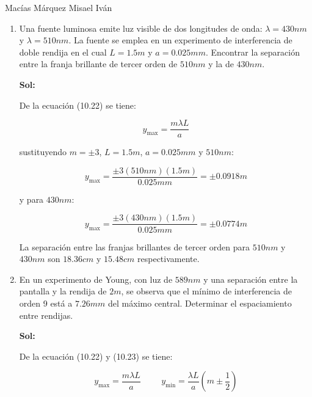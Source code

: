 \documentclass[12pt,a4paper]{article}
\begin{document}
Macías Márquez Misael Iván

\begin{enumerate}






\item Una fuente luminosa emite luz visible de dos longitudes de onda: $\lambda=430nm$ y $\lambda=510nm$. La fuente se emplea en un experimento de interferencia de doble rendija en el cual $L=1.5m$ y $a=0.025mm$. Encontrar la separación entre la franja brillante de tercer orden de $510nm$ y la de $430nm$.

\textbf{Sol:}

De la ecuación (10.22) se tiene:

\begin{equation*}
    y_{\text{max}} = \frac{m \lambda L}{a}
\end{equation*}

sustituyendo $m = \pm 3 $, $L=1.5 m$, $a=0.025 mm$ y $510nm$:

\begin{equation*}
    y_{\text{max}} = \frac{\pm 3 (510nm) (1.5m)}{0.025mm} = \pm 0.0918 m
\end{equation*}

y para $430 nm$:

\begin{equation*}
    y_{\text{max}} = \frac{\pm 3 (430nm) (1.5m)}{0.025 mm} = \pm 0.0774 m
\end{equation*}

La separación entre las franjas brillantes de tercer orden para $510nm$ y $430nm$ son $18.36cm$ y $15.48cm$ respectivamente.






\item En un experimento de Young, con luz de $589nm$ y una separación entre la pantalla y la rendija de $2m$, se observa que el mínimo de interferencia de orden 9 está a $7.26mm$ del máximo central. Determinar el espaciamiento entre rendijas.

\textbf{Sol:}

De la ecuación (10.22) y (10.23) se tiene:

\begin{equation*}
    y_{\text{max}} = \frac{m \lambda L}{a} \hspace{1cm} y_{\text{min}} =  \frac{\lambda L}{a} \left(m \pm \frac{1}{2}\right)
\end{equation*}


\end{enumerate}
\end{document}
